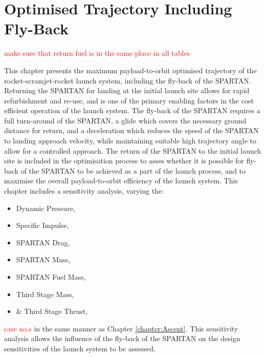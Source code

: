 
\cleardoublepage
\chapter{Optimised Trajectory Including Fly-Back}\label{chapter:Flyback}
\textcolor{red}{make sure that return fuel is in the same place in all tables}

This chapter presents the maximum payload-to-orbit optimised trajectory of the rocket-scramjet-rocket launch system, including the fly-back of the SPARTAN. 
 Returning the SPARTAN for landing at the initial launch site allows for rapid refurbishment and re-use, and is one of the primary enabling factors in the cost efficient operation of the launch system. 
The fly-back of the SPARTAN requires a full turn-around of the SPARTAN, a glide which covers the necessary ground distance for return, and a deceleration which reduces the speed of the SPARTAN to landing approach velocity, while maintaining suitable high trajectory angle to allow for a controlled approach. 
The return of the SPARTAN to the initial launch site is included in the optimisation process to asses whether it is possible for fly-back of the SPARTAN to be achieved as a part of the launch process, and to maximise the overall payload-to-orbit efficiency of the launch system. 
This chapter includes a sensitivity analysis, varying the:
 \begin{itemize}
	\item Dynamic Pressure,
	\item Specific Impulse,
	\item SPARTAN Drag,
	\item SPARTAN Mass,
	\item SPARTAN Fuel Mass,
	\item Third Stage Mass,
	\item \& Third Stage Thrust,
\end{itemize}
\textcolor{red}{case no.s}
in the same manner as Chapter \ref{chapter:Ascent}. 
This sensitivity analysis allows the influence of the fly-back of the SPARTAN on the design sensitivities of the launch system to be assessed.


